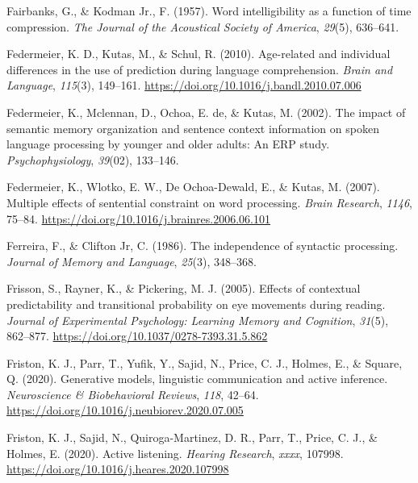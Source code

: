 \documentclass[a4paper, nobind]{templates/ociamthesis}
\newlength{\cslhangindent}
\newenvironment{CSLReferences}[2] %
 {%
  \setlength{\parindent}{0pt}
  \ifodd #1
  \let\oldpar\par
  \def\par{\hangindent=\cslhangindent\oldpar}
  \fi
  \setlength{\parskip}{1mm}
  \setlength{\baselineskip}{6mm}
 }%
 {}
\begin{document}
\begin{CSLReferences}{1}{0}
\leavevmode{}%
Fairbanks, G., \& Kodman Jr., F. (1957). {Word intelligibility as a function of time compression}. \emph{The Journal of the Acoustical Society of America}, \emph{29}(5), 636--641.

\leavevmode{}%
Federmeier, K. D., Kutas, M., \& Schul, R. (2010). {Age-related and individual differences in the use of prediction during language comprehension}. \emph{Brain and Language}, \emph{115}(3), 149--161. \url{https://doi.org/10.1016/j.bandl.2010.07.006}

\leavevmode{}%
Federmeier, K., Mclennan, D., Ochoa, E. de, \& Kutas, M. (2002). {The impact of semantic memory organization and sentence context information on spoken language processing by younger and older adults: An ERP study}. \emph{Psychophysiology}, \emph{39}(02), 133--146.

\leavevmode{}%
Federmeier, K., Wlotko, E. W., De Ochoa-Dewald, E., \& Kutas, M. (2007). Multiple effects of sentential constraint on word processing. \emph{Brain Research}, \emph{1146}, 75--84. \url{https://doi.org/10.1016/j.brainres.2006.06.101}

\leavevmode{}%
Ferreira, F., \& Clifton Jr, C. (1986). The independence of syntactic processing. \emph{Journal of Memory and Language}, \emph{25}(3), 348--368.

\leavevmode{}%
Frisson, S., Rayner, K., \& Pickering, M. J. (2005). {Effects of contextual predictability and transitional probability on eye movements during reading}. \emph{Journal of Experimental Psychology: Learning Memory and Cognition}, \emph{31}(5), 862--877. \url{https://doi.org/10.1037/0278-7393.31.5.862}

\leavevmode{}%
Friston, K. J., Parr, T., Yufik, Y., Sajid, N., Price, C. J., Holmes, E., \& Square, Q. (2020). {Generative models, linguistic communication and active inference}. \emph{Neuroscience {\&} Biobehavioral Reviews}, \emph{118}, 42--64. \url{https://doi.org/10.1016/j.neubiorev.2020.07.005}

\leavevmode{}%
Friston, K. J., Sajid, N., Quiroga-Martinez, D. R., Parr, T., Price, C. J., \& Holmes, E. (2020). {Active listening}. \emph{Hearing Research}, \emph{xxxx}, 107998. \url{https://doi.org/10.1016/j.heares.2020.107998}


\end{CSLReferences}
\end{document}
